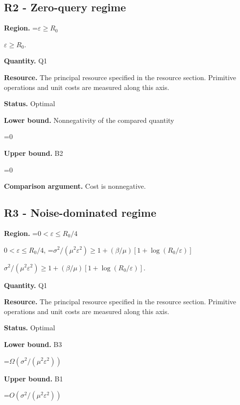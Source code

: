 \documentclass[10pt,a4paper]{article}
\newcommand{\AtlasMath}[1]{\par\begingroup\centering\setbox0=\hbox{$\displaystyle #1$}\ifdim\wd0>1.4\linewidth\typeout{ATLAS WIDE FORMULA: \the\wd0}\fi\ifdim\wd0>\linewidth\resizebox{\linewidth}{!}{\box0}\else\box0\fi\par\endgroup}
\newcommand{\AtlasInlineMath}[1]{\begingroup\setbox0=\hbox{$#1$}\ifdim\wd0>.4\linewidth\endgroup\AtlasMath{#1}\else\endgroup$#1$\fi}
\begin{document}
\subsection{R2 - Zero-query regime}


\textbf{Region.} \AtlasInlineMath{\varepsilon\ge R_0}.



\textbf{Quantity.} Q1



\textbf{Resource.} The principal resource specified in the resource section. Primitive operations and unit costs are measured along this axis.



\textbf{Status.} Optimal



\textbf{Lower bound.} Nonnegativity of the compared quantity



\AtlasMath{0}


\textbf{Upper bound.} B2



\AtlasMath{0}


\textbf{Comparison argument.} Cost is nonnegative.



\subsection{R3 - Noise-dominated regime}


\textbf{Region.} \AtlasInlineMath{0<\varepsilon\le R_0/4}, \AtlasInlineMath{\sigma^2/(\mu^2\varepsilon^2)\ge1+(\beta/\mu)[1+\log(R_0/\varepsilon)]}.



\textbf{Quantity.} Q1



\textbf{Resource.} The principal resource specified in the resource section. Primitive operations and unit costs are measured along this axis.



\textbf{Status.} Optimal



\textbf{Lower bound.} B3



\AtlasMath{\Omega(\sigma^2/(\mu^2\varepsilon^2))}


\textbf{Upper bound.} B1



\AtlasMath{O(\sigma^2/(\mu^2\varepsilon^2))}
\end{document}
